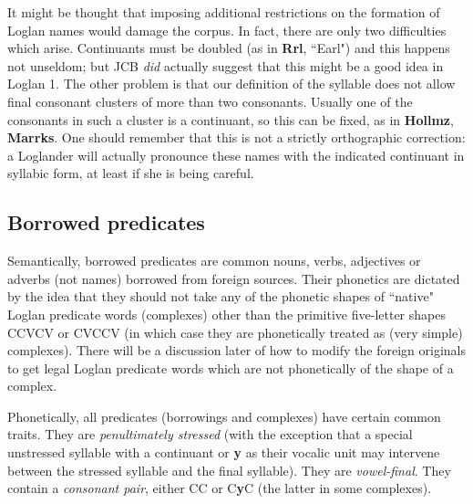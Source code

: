 \documentclass[12pt]{book}
\begin{document}
It might be thought that imposing additional restrictions on the formation of Loglan names would damage the corpus.  In fact, there are only two difficulties which arise.  Continuants must be doubled (as in {\bf Rrl}, ``Earl") and this happens not unseldom;  but JCB {\em did\/} actually suggest that this might be a good idea in Loglan 1.  The other problem is that our definition of the syllable does not allow final consonant clusters of more than two consonants.  Usually one of the consonants in such a cluster is a continuant, so this can be fixed, as in {\bf Hollmz}, {\bf Marrks}.  One should remember that this is not a strictly orthographic correction:  a Loglander will actually pronounce these names with the indicated continuant in syllabic form, at least if she is being careful.

\subsection{Borrowed predicates}

Semantically, borrowed predicates are common nouns, verbs, adjectives or adverbs (not names) borrowed from foreign sources.  Their phonetics are dictated by the idea that they should not take any of the phonetic shapes of ``native" Loglan predicate words (complexes) other than the primitive five-letter shapes
CCVCV or CVCCV (in which case they are phonetically treated as (very simple) complexes).  There will be a discussion later of how to modify
the foreign originals to get legal Loglan predicate words which are not phonetically of the shape of a complex.

Phonetically, all predicates (borrowings and complexes) have certain common traits.  They are {\em penultimately stressed\/} (with the exception that a special unstressed syllable with a continuant or {\bf y} as their vocalic unit may intervene between the stressed syllable and the final syllable).  They are {\em vowel-final\/}.  They contain a {\em consonant pair\/}, either CC or C{\bf y}C (the latter in some complexes).
\end{document}
